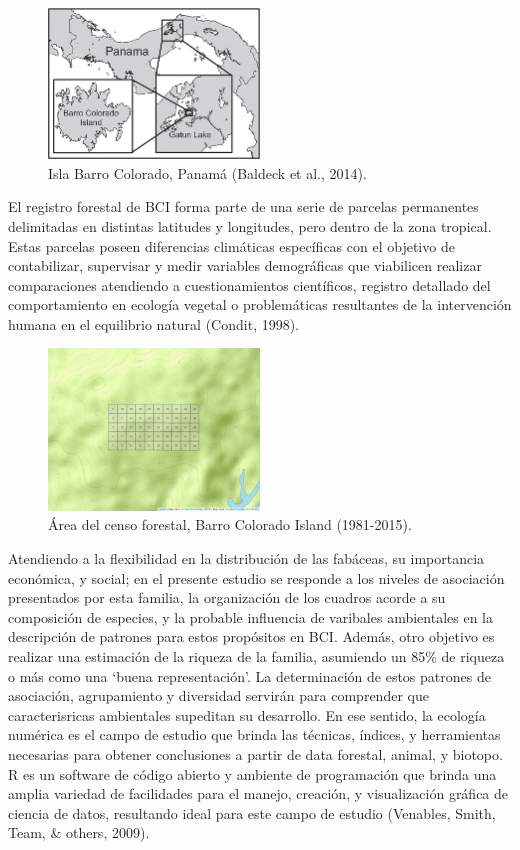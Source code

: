 \documentclass[11pt,]{article}
\begin{document}
\begin{figure}
\centering
\includegraphics[width=0.50000\textwidth]{Map-of-Barro-Colorado-Island-BCI-Panama.png}
\caption{Isla Barro Colorado, Panamá (Baldeck et al., 2014).}
\end{figure}

El registro forestal de BCI forma parte de una serie de parcelas
permanentes delimitadas en distintas latitudes y longitudes, pero dentro
de la zona tropical. Estas parcelas poseen diferencias climáticas
específicas con el objetivo de contabilizar, supervisar y medir
variables demográficas que viabilicen realizar comparaciones atendiendo
a cuestionamientos científicos, registro detallado del comportamiento en
ecología vegetal o problemáticas resultantes de la intervención humana
en el equilibrio natural (Condit, 1998).

\begin{figure}
\centering
\includegraphics[width=0.50000\textwidth]{mapa_cuadros.png}
\caption{Área del censo forestal, Barro Colorado Island (1981-2015).}
\end{figure}

Atendiendo a la flexibilidad en la distribución de las fabáceas, su
importancia económica, y social; en el presente estudio se responde a
los niveles de asociación presentados por esta familia, la organización
de los cuadros acorde a su composición de especies, y la probable
influencia de varibales ambientales en la descripción de patrones para
estos propósitos en BCI. Además, otro objetivo es realizar una
estimación de la riqueza de la familia, asumiendo un 85\% de riqueza o
más como una `buena representación'. La determinación de estos patrones
de asociación, agrupamiento y diversidad servirán para comprender que
caracterisricas ambientales supeditan su desarrollo. En ese sentido, la
ecología numérica es el campo de estudio que brinda las técnicas,
índices, y herramientas necesarias para obtener conclusiones a partir de
data forestal, animal, y biotopo. R es un software de código abierto y
ambiente de programación que brinda una amplia variedad de facilidades
para el manejo, creación, y visualización gráfica de ciencia de datos,
resultando ideal para este campo de estudio (Venables, Smith, Team, \&
others, 2009).
\end{document}

